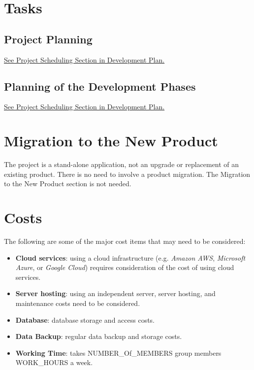 \documentclass[12pt]{article}
\begin{document}
\section{Tasks}
\subsection{Project Planning}
\href{https://github.com/wangq131/4G06CapstoneProjectT5/blob/main/docs/DevelopmentPlan/DevelopmentPlan.tex#L248C1-L265C6}{See Project Scheduling Section in Development Plan.}
\subsection{Planning of the Development Phases}
\href{https://github.com/wangq131/4G06CapstoneProjectT5/blob/main/docs/DevelopmentPlan/DevelopmentPlan.tex#L194C1-L245C16}{See Project Scheduling Section in Development Plan.}

\section{Migration to the New Product}
The project is a stand-alone application, not an upgrade or replacement of an existing product. There is no need to involve a product migration. The Migration to the New Product section is not needed.

\section{Costs}
The following are some of the major cost items that may need to be considered:

\begin{itemize} 
  \item \textbf{Cloud services}: using a cloud infrastructure (e.g. \textit{Amazon AWS}, \textit{Microsoft Azure}, or \textit{Google Cloud}) requires consideration of the cost of using cloud services.
  \item \textbf{Server hosting}: using an independent server, server hosting, and maintenance costs need to be considered.
  \item \textbf{Database}: database storage and access costs.
  \item \textbf{Data Backup}: regular data backup and storage costs.
  \item \textbf{Working Time}: takes NUMBER\_Of\_MEMBERS group members WORK\_HOURS a week.
\end{itemize}
\end{document}
